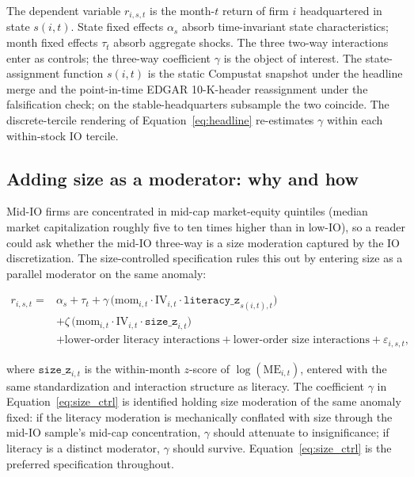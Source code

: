 The dependent variable $r_{i,s,t}$ is the month-$t$ return of firm $i$ headquartered in state $s(i,t)$. State fixed effects $\alpha_{s}$ absorb time-invariant state characteristics; month fixed effects $\tau_{t}$ absorb aggregate shocks. The three two-way interactions enter as controls; the three-way coefficient $\gamma$ is the object of interest. The state-assignment function $s(i,t)$ is the static Compustat snapshot under the headline merge and the point-in-time EDGAR 10-K-header reassignment under the falsification check; on the stable-headquarters subsample the two coincide. The discrete-tercile rendering of Equation~\eqref{eq:headline} re-estimates $\gamma$ within each within-stock IO tercile.

\subsection{Adding size as a moderator: why and how}

Mid-IO firms are concentrated in mid-cap market-equity quintiles (median market capitalization roughly five to ten times higher than in low-IO), so a reader could ask whether the mid-IO three-way is a size moderation captured by the IO discretization. The size-controlled specification rules this out by entering size as a parallel moderator on the same anomaly:

\begin{equation}
\label{eq:size_ctrl}
\begin{split}
r_{i,s,t} = {}& \alpha_{s} + \tau_{t} + \gamma \,\bigl(\mathrm{mom}_{i,t}\cdot\mathrm{IV}_{i,t}\cdot\mathtt{literacy\_z}_{s(i,t),t}\bigr) \\
& + \zeta \,\bigl(\mathrm{mom}_{i,t}\cdot\mathrm{IV}_{i,t}\cdot\mathtt{size\_z}_{i,t}\bigr) \\
& + \text{lower-order literacy interactions} + \text{lower-order size interactions} + \varepsilon_{i,s,t},
\end{split}
\end{equation}

where $\mathtt{size\_z}_{i,t}$ is the within-month $z$-score of $\log(\mathrm{ME}_{i,t})$, entered with the same standardization and interaction structure as literacy. The coefficient $\gamma$ in Equation~\eqref{eq:size_ctrl} is identified holding size moderation of the same anomaly fixed: if the literacy moderation is mechanically conflated with size through the mid-IO sample's mid-cap concentration, $\gamma$ should attenuate to insignificance; if literacy is a distinct moderator, $\gamma$ should survive. Equation~\eqref{eq:size_ctrl} is the preferred specification throughout.

